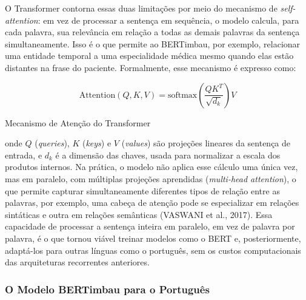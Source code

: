 \documentclass[12pt,a4paper]{extarticle}
\newcommand{\myequation}[1]{
    \addcontentsline{equ}{myequations}
    {\protect\numberline{\theequation}#1}
}
\begin{document}
O Transformer contorna essas duas limitações por meio do mecanismo de \textit{self-attention}: em vez de processar a sentença em sequência, o modelo calcula, para cada palavra, sua relevância em relação a todas as demais palavras da sentença simultaneamente. Isso é o que permite ao BERTimbau, por exemplo, relacionar uma entidade temporal a uma especialidade médica mesmo quando elas estão distantes na frase do paciente. Formalmente, esse mecanismo é expresso como:

\begin{equation}
\text{Attention}(Q, K, V)=
\text{softmax}\left(
\frac{QK^T}{\sqrt{d_k}}
\right)V
\label{eq:attention}
\end{equation}

\myequation{Mecanismo de Atenção do Transformer}


onde $Q$ (\textit{queries}), $K$ (\textit{keys}) e $V$ (\textit{values}) são projeções lineares da sentença de entrada, e $d_k$ é a dimensão das chaves, usada para normalizar a escala dos produtos internos. Na prática, o modelo não aplica esse cálculo uma única vez, mas em paralelo, com múltiplas projeções aprendidas (\textit{multi-head attention}), o que permite capturar simultaneamente diferentes tipos de relação entre as palavras, por exemplo, uma cabeça de atenção pode se especializar em relações sintáticas e outra em relações semânticas (VASWANI et al., 2017). Essa capacidade de processar a sentença inteira em paralelo, em vez de palavra por palavra, é o que tornou viável treinar modelos como o BERT e, posteriormente, adaptá-los para outras línguas como o português, sem os custos computacionais das arquiteturas recorrentes anteriores.

\subsubsection{O Modelo BERTimbau para o Português}
\label{sec:bertimbau}
\end{document}
